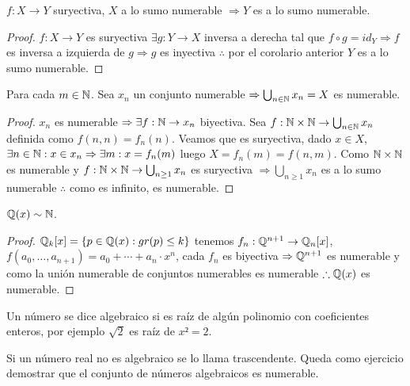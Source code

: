 \begin{theorem}
	\(f: X \to Y\) suryectiva, \(X\) a lo sumo numerable \(\Rightarrow Y\) es a lo sumo numerable.
	\begin{proof}
		\(f: X \to Y\) es suryectiva \(\exists g: Y \to X\) inversa a derecha tal que \(f \circ g = id_Y \Rightarrow f\) es inversa a izquierda de \(g \Rightarrow g\) es inyectiva \(\therefore \) por el corolario anterior \(Y\) es a lo sumo numerable.
	\end{proof}
\end{theorem}

\begin{theorem}
	Para cada \(m \in \mathbb{N} \). Sea \(x_n\) un conjunto numerable \(\Rightarrow \bigcup_{n \in \mathbb{N}}x_n = X\) es numerable.
	\begin{proof}
		\(x_n\) es numerable \(\Rightarrow \exists f:\mathbb{N} \to x_n\) biyectiva. Sea \(f:\mathbb{N} \times \mathbb{N} \to \bigcup_{n \in \mathbb{N}} x_n\) definida como \(f(n, n) = f_n(n)\). Veamos que es suryectiva, dado \(x \in X\), \(\exists n \in \mathbb{N}:x \in x_n \Rightarrow \exists m:x=f_n(m)\) luego \(X=f_n(m) = f(n, m)\). Como \(\mathbb{N} \times \mathbb{N} \) es numerable y \(f: \mathbb{N} \times \mathbb{N} \to \bigcup_{n \geq 1}{x_n} \) es suryectiva \(\Rightarrow \bigcup_{n \geq 1}x_n\) es a lo sumo numerable \(\therefore \) como es infinito, es numerable.
	\end{proof}
\end{theorem}

\begin{eg}
	\(\mathbb{Q}(x) \sim \mathbb{N} \).
	\begin{proof}
		\(\mathbb{Q}_k[x] = \{ p \in \mathbb{Q}(x) : gr(p) \leq k \} \) tenemos \(f_n : \mathbb{Q}^{n+1} \to \mathbb{Q}_n[x]\), \(f(a_0, \ldots, a_{n+1}) = a_0 + \cdots + a_n \cdot x^n\), cada \(f_n\) es biyectiva \(\Rightarrow \mathbb{Q}^{n+1} \) es numerable y como la unión numerable de conjuntos numerables es numerable \(\therefore \mathbb{Q}(x)\) es numerable.
	\end{proof}
\end{eg}

\begin{definition}
	Un número se dice algebraico si es raíz de algún polinomio con coeficientes enteros, por ejemplo \(\sqrt{2} \) es raíz de \(x² = 2\).
\end{definition}

\begin{definition}
	Si un número real no es algebraico se lo llama trascendente. Queda como ejercicio demostrar que el conjunto de números algebraicos es numerable.
\end{definition}
